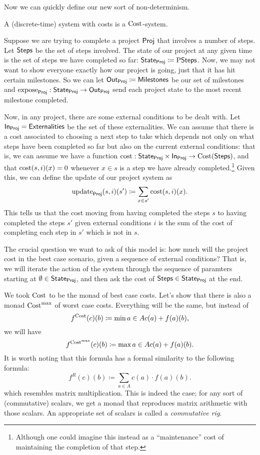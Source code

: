 \documentclass[DynamicalBook]{subfiles}
\begin{document}
Now we can quickly define our new sort of non-determinism.
\begin{definition}
A (discrete-time) system with costs is a $\mathrm{Cost}$-system.
\end{definition}


\begin{example}
  Suppose we are trying to complete a project $\mathsf{Proj}$ that involves a number of steps.
  Let $\mathsf{Steps}$ be the set of steps involved. The state of our project at any given
  time is the set of steps we have completed so far: $\mathsf{State}_{\mathsf{Proj}} \coloneqq
  \mathrm{P}\mathsf{Steps}$. Now, we may not want to show everyone exactly how our
  project is going, just that it has hit certain milestones. So we can let
  $\mathsf{Out}_{\mathsf{Proj}} \coloneqq \mathsf{Milestones}$ be our set of milestones and
  $\mathrm{expose}_{\mathsf{Proj}} : \mathsf{State}_{\mathsf{Proj}} \to \mathsf{Out}_{\mathsf{Proj}}$ send each project state to the
  most recent milestone completed.

  Now, in any project, there are some external conditions
  to be dealt with. Let $\mathsf{In}_{\mathsf{Proj}} = \mathsf{Externalities}$
  be the set of these externalities. We can assume that there is a cost
  associated to choosing a next step to take which depends not only on what
  steps have been completed so far but also on the current external conditions:
  that is, we can assume we have a function $\mathrm{cost} : \mathsf{State}_{\mathsf{Proj}} \times
  \mathsf{In}_{\mathsf{Proj}} \to \mathrm{Cost}(\mathsf{Steps})$, and that $\mathrm{cost}(s, i)(x) = 0$
  whenever $x \in s$ is a step we have already completed.\footnote{Although one
    could imagine this instead as a ``maintenance'' cost of maintaining the
    completion of that step.} Given this, we can define the update
  of our project system as
  \[
\mathrm{update}_{\mathsf{Proj}}(s, i)(s') \coloneqq \sum_{x \in s'} \mathrm{cost}(s,
  i)(x).
  \]
  This tells us that the cost moving from having completed the steps $s$ to
  having completed the steps $s'$ given external conditions $i$ is the sum of
  the cost of completing each step in $s'$ which is not in $s$.

  The crucial question we want to ask of this model is: how much will the
  project cost in the best case scenario, given a sequence of external
  conditions? That is, we will iterate the action of the system through the
  sequence of paramters starting at
  $\emptyset \in \mathsf{State}_{\mathsf{Proj}}$, and then ask the cost of $\mathsf{Steps} \in
  \mathsf{State}_{\mathsf{Proj}}$ at the end. 
\end{example}

We took $\mathrm{Cost}$ to be the monad of best case costs. Let's show that there
is also a monad $\mathrm{Cost}^{\max}$ of worst case costs. Everything will be the same, but instead of
\[f^{\mathrm{Cost}}(c)(b) \coloneqq \min{a \in A} c(a) + f(a)(b),\]
we will have
\[
f^{\mathrm{Cost}^{\max}}(c)(b) \coloneqq \max{a \in A} c(a) + f(a)(b).
\]
It is worth noting that this formula has a formal similarity to the following
formula:
\[
f^{R}(c)(b) \coloneqq \sum_{a \in A} c(a)\cdot f(a)(b).
\]
which resembles matrix multiplication. This is indeed the case; for any sort of
(commutative) scalars, we get a monad that reproduces matrix arithmetic with
those scalars. An appropriate set of scalars is called a \emph{commutative rig}.
\end{document}

